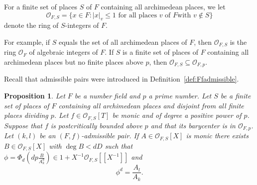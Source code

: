 \documentclass[12pt,oneside,a4]{amsart}
\newcommand{\cO}{\mathcal{O}}
\newcounter{maincounter}
\numberwithin{maincounter}{section}
\numberwithin{equation}{section}
\newtheorem{propo}[maincounter]{Proposition}
\renewcommand{\subset}{\subseteq}
\begin{document}
For a finite set of places $S$ of $F$ containing all archimedean
places, we let
\begin{equation*}
  \cO_{F,S} = \{ x\in F : |x|_v \le 1\text{ for all places $v$ of $F$
    with $v\not\in S$}\}
\end{equation*}
denote the ring of $S$-integers of $F$. 

For example, if $S$ equals the set of all
archimedean places of $F$, then $\cO_{F,S}$ is the ring $\cO_F$ of algebraic
integers of $F$. If $S$ is a finite set of places of $F$
containing all archimedean places but no finite places above $p$, then
$\cO_{F,S}\subset \cO_{F,p}$.

Recall that admissible pairs were introduced in Definition~\ref{def:Ffadmissible}.
\begin{propo}
  \label{prop:maincongruence}
  Let $F$ be a number field and $p$ a prime number.
  Let $S$ be a finite set of places of $F$ containing all archimedean places
  and disjoint from all finite places dividing $p$.
  Let $f\in \cO_{F,S}[T]$ be monic and of degree a positive power of
  $p$.
  Suppose that $f$ is postcritically bounded
  above $p$ and that its barycenter is in $\cO_{F,p}$.
  Let $(k,l)$ be an $(F,f)$-admissible pair. 
  If $A\in \cO_{F,S}[X]$ is monic there
  exists $B\in \cO_{F,S}[X]$ with $\deg B < dD$ such that
  $\phi = \Phi_d\left(dp\frac{B}{A_k^d}\right) \in 1+X^{-1}\cO_{F,S}[[X^{-1}]]$
  and 
  \begin{equation}
    \label{eq:powerseriesequation}
    \phi^d = \frac{A_l}{A_k}.
  \end{equation} 
\end{propo}
\end{document}
